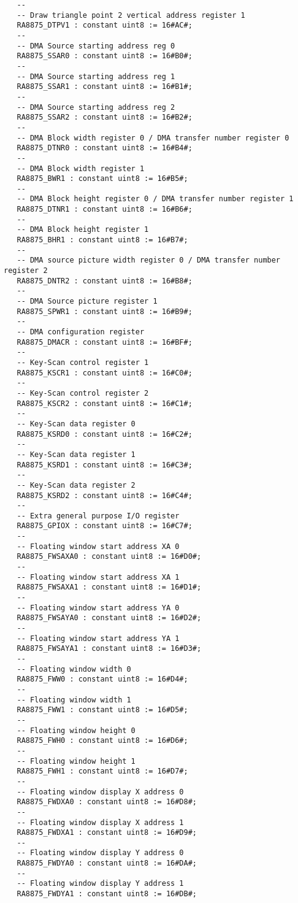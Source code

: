 \documentclass[10pt, openany]{book}
\begin{document}
\begin{lstlisting}
   --
   -- Draw triangle point 2 vertical address register 1
   RA8875_DTPV1 : constant uint8 := 16#AC#;
   --
   -- DMA Source starting address reg 0
   RA8875_SSAR0 : constant uint8 := 16#B0#;
   --
   -- DMA Source starting address reg 1
   RA8875_SSAR1 : constant uint8 := 16#B1#;
   --
   -- DMA Source starting address reg 2
   RA8875_SSAR2 : constant uint8 := 16#B2#;
   --
   -- DMA Block width register 0 / DMA transfer number register 0
   RA8875_DTNR0 : constant uint8 := 16#B4#;
   --
   -- DMA Block width register 1
   RA8875_BWR1 : constant uint8 := 16#B5#;
   --
   -- DMA Block height register 0 / DMA transfer number register 1
   RA8875_DTNR1 : constant uint8 := 16#B6#;
   --
   -- DMA Block height register 1
   RA8875_BHR1 : constant uint8 := 16#B7#;
   --
   -- DMA source picture width register 0 / DMA transfer number register 2
   RA8875_DNTR2 : constant uint8 := 16#B8#;
   --
   -- DMA Source picture register 1
   RA8875_SPWR1 : constant uint8 := 16#B9#;
   --
   -- DMA configuration register
   RA8875_DMACR : constant uint8 := 16#BF#;
   --
   -- Key-Scan control register 1
   RA8875_KSCR1 : constant uint8 := 16#C0#;
   --
   -- Key-Scan control register 2
   RA8875_KSCR2 : constant uint8 := 16#C1#;
   --
   -- Key-Scan data register 0
   RA8875_KSRD0 : constant uint8 := 16#C2#;
   --
   -- Key-Scan data register 1
   RA8875_KSRD1 : constant uint8 := 16#C3#;
   --
   -- Key-Scan data register 2
   RA8875_KSRD2 : constant uint8 := 16#C4#;
   --
   -- Extra general purpose I/O register
   RA8875_GPIOX : constant uint8 := 16#C7#;
   --
   -- Floating window start address XA 0
   RA8875_FWSAXA0 : constant uint8 := 16#D0#;
   --
   -- Floating window start address XA 1
   RA8875_FWSAXA1 : constant uint8 := 16#D1#;
   --
   -- Floating window start address YA 0
   RA8875_FWSAYA0 : constant uint8 := 16#D2#;
   --
   -- Floating window start address YA 1
   RA8875_FWSAYA1 : constant uint8 := 16#D3#;
   --
   -- Floating window width 0
   RA8875_FWW0 : constant uint8 := 16#D4#;
   --
   -- Floating window width 1
   RA8875_FWW1 : constant uint8 := 16#D5#;
   --
   -- Floating window height 0
   RA8875_FWH0 : constant uint8 := 16#D6#;
   --
   -- Floating window height 1
   RA8875_FWH1 : constant uint8 := 16#D7#;
   --
   -- Floating window display X address 0
   RA8875_FWDXA0 : constant uint8 := 16#D8#;
   --
   -- Floating window display X address 1
   RA8875_FWDXA1 : constant uint8 := 16#D9#;
   --
   -- Floating window display Y address 0
   RA8875_FWDYA0 : constant uint8 := 16#DA#;
   --
   -- Floating window display Y address 1
   RA8875_FWDYA1 : constant uint8 := 16#DB#;

\end{lstlisting}
\end{document}
